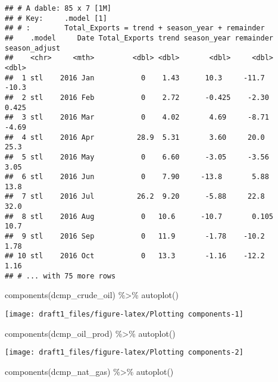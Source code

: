 \documentclass[
]{article}
\newenvironment{Shaded}{\begin{snugshade}}{\end{snugshade}}
\newcommand{\FunctionTok}[1]{\textcolor[rgb]{0.00,0.00,0.00}{#1}}
\newcommand{\NormalTok}[1]{#1}
\newcommand{\SpecialCharTok}[1]{\textcolor[rgb]{0.00,0.00,0.00}{#1}}
\begin{document}
\begin{verbatim}
## # A dable: 85 x 7 [1M]
## # Key:     .model [1]
## # :        Total_Exports = trend + season_year + remainder
##    .model     Date Total_Exports trend season_year remainder season_adjust
##    <chr>     <mth>         <dbl> <dbl>       <dbl>     <dbl>         <dbl>
##  1 stl    2016 Jan           0    1.43      10.3     -11.7         -10.3  
##  2 stl    2016 Feb           0    2.72      -0.425    -2.30          0.425
##  3 stl    2016 Mar           0    4.02       4.69     -8.71         -4.69 
##  4 stl    2016 Apr          28.9  5.31       3.60     20.0          25.3  
##  5 stl    2016 May           0    6.60      -3.05     -3.56          3.05 
##  6 stl    2016 Jun           0    7.90     -13.8       5.88         13.8  
##  7 stl    2016 Jul          26.2  9.20      -5.88     22.8          32.0  
##  8 stl    2016 Aug           0   10.6      -10.7       0.105        10.7  
##  9 stl    2016 Sep           0   11.9       -1.78    -10.2           1.78 
## 10 stl    2016 Oct           0   13.3       -1.16    -12.2           1.16 
## # ... with 75 more rows
\end{verbatim}

\begin{Shaded}
\begin{Highlighting}[]
\FunctionTok{components}\NormalTok{(dcmp\_crude\_oil) }\SpecialCharTok{\%\textgreater{}\%} \FunctionTok{autoplot}\NormalTok{()}
\end{Highlighting}
\end{Shaded}

\begin{center}\texttt{[image: draft1\_files/figure-latex/Plotting components-1]} \end{center}

\begin{Shaded}
\begin{Highlighting}[]
\FunctionTok{components}\NormalTok{(dcmp\_oil\_prod) }\SpecialCharTok{\%\textgreater{}\%} \FunctionTok{autoplot}\NormalTok{()}
\end{Highlighting}
\end{Shaded}

\begin{center}\texttt{[image: draft1\_files/figure-latex/Plotting components-2]} \end{center}

\begin{Shaded}
\begin{Highlighting}[]
\FunctionTok{components}\NormalTok{(dcmp\_nat\_gas) }\SpecialCharTok{\%\textgreater{}\%} \FunctionTok{autoplot}\NormalTok{()}
\end{Highlighting}
\end{Shaded}
\end{document}
